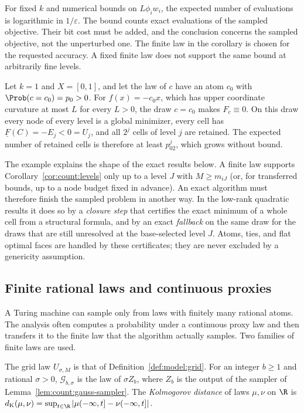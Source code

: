 For fixed $k$ and numerical bounds on $L\phi_iw_i$, the expected number of
evaluations is logarithmic in $1/\varepsilon$. The bound counts exact
evaluations of the sampled objective. Their bit cost must be added, and the
conclusion concerns the sampled objective, not the unperturbed one. The
finite law in the corollary is chosen for the requested accuracy. A fixed
finite law does not support the same bound at arbitrarily fine levels.

\begin{example}\label{ex:count:atom}
Let $k=1$ and $X=[0,1]$, and let the law of $c$ have an atom $c_0$ with
$\Prob(c=c_0)=p_0>0$. For $f(x)=-c_0x$, which has upper coordinate curvature at
most $L$ for every $L>0$, the draw $c=c_0$ makes $F_c\equiv0$. On this draw every node
of every level is a global minimizer, every cell has
$\underline F(C)=-E_j<0=U_j$, and all $2^j$ cells of level $j$ are retained.
The expected number of retained cells is therefore at least $p_02^j$, which
grows without bound.
\end{example}

The example explains the shape of the exact results below. A finite law
supports Corollary~\ref{cor:count:levels} only up to a level $J$ with
$M\ge m_{iJ}$ (or, for transferred bounds, up to a node budget fixed in
advance). An exact algorithm must therefore finish the sampled problem in
another way. In the low-rank quadratic results it does so by a \emph{closure
step} that certifies the exact minimum of a whole cell from a structural
formula, and by an exact \emph{fallback} on the same draw for the draws that
are still unresolved at the base-selected level $J$. Atoms, ties, and flat
optimal faces are handled by these certificates; they are never excluded by
a genericity assumption.

\subsection{Finite rational laws and continuous proxies}\label{sec:count:laws}

A Turing machine can sample only from laws with finitely many rational atoms.
The analysis often computes a probability under a continuous proxy law and
then transfers it to the finite law that the algorithm actually samples. Two
families of finite laws are used.

\begin{definition}\label{def:count:laws}
The grid law $U_{\sigma,M}$ is that of Definition~\ref{def:model:grid}. For an
integer $b\ge1$ and rational $\sigma>0$,
$\mathcal G_{b,\sigma}$ is the law of $\sigma Z_b$, where $Z_b$ is the
output of the sampler of Lemma~\ref{lem:count:gauss-sampler}. The
\emph{Kolmogorov distance} of laws $\mu,\nu$ on $\R$ is
$d_{\rm K}(\mu,\nu)=\sup_{t\in\R}|\mu(-\infty,t]-\nu(-\infty,t]|$.
\end{definition}


